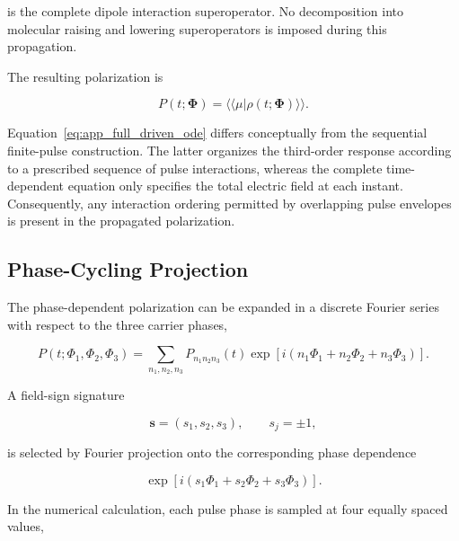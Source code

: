\documentclass[11pt]{article}
\begin{document}
is the complete dipole interaction superoperator.  No decomposition
into molecular raising and lowering superoperators is imposed during
this propagation.

The resulting polarization is

\begin{equation}
P(t;\boldsymbol{\Phi})
=
\langle\!\langle
\mu
|
\rho(t;\boldsymbol{\Phi})
\rangle\rangle.
\label{eq:app_phase_dependent_polarization}
\end{equation}

Equation~\eqref{eq:app_full_driven_ode} differs conceptually from the
sequential finite-pulse construction.  The latter organizes the
third-order response according to a prescribed sequence of pulse
interactions, whereas the complete time-dependent equation only
specifies the total electric field at each instant.  Consequently,
any interaction ordering permitted by overlapping pulse envelopes is
present in the propagated polarization.


\subsection{Phase-Cycling Projection}
\label{app:phase_cycling_projection}

The phase-dependent polarization can be expanded in a discrete Fourier
series with respect to the three carrier phases,

\begin{equation}
P(t;\Phi_1,\Phi_2,\Phi_3)
=
\sum_{n_1,n_2,n_3}
P_{n_1n_2n_3}(t)
\exp
\left[
i
\left(
n_1\Phi_1
+
n_2\Phi_2
+
n_3\Phi_3
\right)
\right].
\label{eq:app_phase_fourier_expansion}
\end{equation}

A field-sign signature

\begin{equation}
\mathbf{s}
=
(s_1,s_2,s_3),
\qquad
s_j=\pm1,
\end{equation}

is selected by Fourier projection onto the corresponding phase
dependence

\begin{equation}
\exp
\left[
i
\left(
s_1\Phi_1
+
s_2\Phi_2
+
s_3\Phi_3
\right)
\right].
\end{equation}

In the numerical calculation, each pulse phase is sampled at four
equally spaced values,
\end{document}
